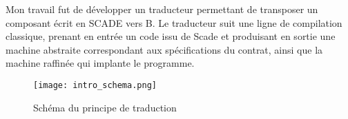 Mon travail fut de développer un traducteur permettant de transposer un
composant écrit en SCADE vers B. Le traducteur suit une ligne de compilation classique, prenant en
entrée un code issu de Scade et produisant en sortie une machine abstraite
correspondant aux spécifications du contrat, ainsi que la machine raffinée qui
implante le programme. \\

\begin{figure}[h]
\begin{center}
\texttt{[image: intro\_schema.png]}
\end{center}
\caption{Schéma du principe de traduction}
\end{figure}
